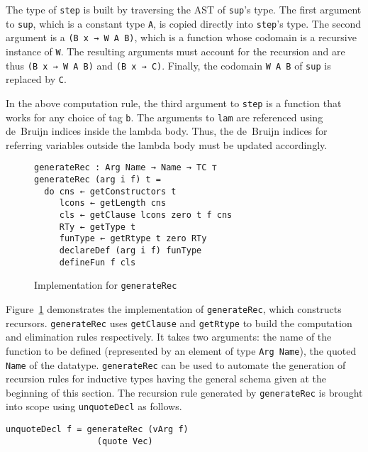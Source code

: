 \documentclass[sigplan,10pt]{acmart}
\begin{document}
The type of {\tt step} is built by traversing the AST of {\tt sup}'s type.
The first argument to {\tt sup}, which is a constant type {\tt A}, is copied directly into \texttt{step}'s type.
The second argument is a {\tt (B x → W A B)}, which is a function whose codomain is a recursive instance of {\tt W}.
The resulting arguments must account for the recursion and are thus {\tt (B x → W A B)} and \texttt{(B x → C)}.
Finally, the codomain {\tt W A B} of {\tt sup} is replaced by {\tt C}.

In the above computation rule, the third argument to {\tt step} is a function that works for any choice of tag \texttt{b}.
The arguments to {\tt lam} are referenced using de~Bruijn indices inside the lambda body.
Thus, the de~Bruijn indices for referring variables outside the lambda body must be updated accordingly.



\begin{figure}
\begin{center}
\begin{Verbatim}
generateRec : Arg Name → Name → TC ⊤
generateRec (arg i f) t =
  do cns ← getConstructors t
     lcons ← getLength cns
     cls ← getClause lcons zero t f cns
     RTy ← getType t
     funType ← getRtype t zero RTy
     declareDef (arg i f) funType
     defineFun f cls
\end{Verbatim}
\end{center}
\caption{Implementation for {\tt generateRec}}
\label{fig:generateRec}
\end{figure}

Figure~\ref{fig:generateRec} demonstrates the implementation of {\tt generateRec}, which constructs recursors.
{\tt generateRec} uses {\tt getClause} and {\tt getRtype} to build the computation and elimination rules respectively. It takes two arguments: the name of the function to be defined (represented by an element of type {\tt Arg Name}), the quoted {\tt Name} of the datatype. {\tt generateRec} can be used to automate the generation of recursion rules for inductive types having the general schema given at the beginning of this section. The recursion rule generated by {\tt generateRec} is brought into scope using {\tt unquoteDecl} as follows.

\begin{center}
\begin{BVerbatim}
unquoteDecl f = generateRec (vArg f)
                  (quote Vec)
\end{BVerbatim}
\end{center}
\end{document}
